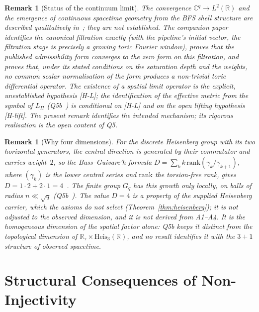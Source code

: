 \documentclass[11pt,a4paper]{article}
\newtheorem{remark}[theorem]{Remark}
\begin{document}
    \begin{remark}[Status of the continuum limit]
      \label{rem:continuum-limit}
      The convergence $\mathbb{C}^q \to L^2(\mathbb{R})$ and the emergence of
      continuous spacetime geometry from the BFS shell structure are described
      qualitatively in~\cite{Cosmochrony}; they are not established.
      The companion paper~\cite{Beau2026q5a} identifies the canonical
      filtration exactly (with the pipeline's initial vector, the filtration stage is
      precisely a growing toric Fourier window), proves that the published
      admissibility form converges to the zero form on this filtration, and proves
      that, under its stated conditions on the saturation depth and the weights, no common scalar
      normalisation of the form produces a non-trivial toric differential operator.
      The existence of a spatial limit operator is the explicit, unestablished
      hypothesis [H-L]; the identification of the effective metric
      from the symbol of $L_\Pi$ (Q5b~\cite{Beau2026q5b}) is conditional on [H-L] and on the open
      lifting hypothesis [H-lift].
      The present remark identifies the intended mechanism; its rigorous realisation
      is the open content of Q5.
    \end{remark}

    \begin{remark}[Why four dimensions]
  For the discrete Heisenberg group with its two horizontal generators, the central direction is
  generated by their commutator and carries weight~$2$, so the Bass--Guivarc'h formula
  $D = \sum_k k\,\mathrm{rank}(\gamma_k/\gamma_{k+1})$, where $(\gamma_k)$ is the lower central series and
  $\mathrm{rank}$ the torsion-free rank, gives
  $D = 1 \cdot 2 + 2 \cdot 1 = 4$~\cite{Bass1972,Guivarch1973}.
  The finite group $G_q$ has this growth only locally, on balls of radius $n \ll \sqrt{q}$
  (Q5b~\cite{Beau2026q5b}).
  The value $D = 4$ is a property of the supplied Heisenberg carrier, which the axioms do not select
  (Theorem~\ref{thm:heisenberg}); it is not adjusted to the observed dimension, and it is not derived
  from A1--A4.
  It is the homogeneous dimension of the spatial factor alone: Q5b keeps it distinct from the topological
  dimension of $\mathbb{R}_\tau \times \mathrm{Heis}_3(\mathbb{R})$, and no result identifies it with the
  $3+1$ structure of observed spacetime.
    \end{remark}

    \clearpage
  \section{Structural Consequences of Non-Injectivity}
  \label{sec:ni-consequences}
\end{document}

